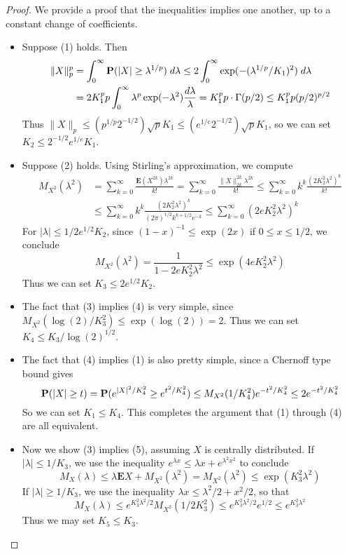 \begin{proof}
    We provide a proof that the inequalities implies one another, up to a constant change of coefficients. 
    \begin{itemize}
        \item Suppose (1) holds. Then
    \begin{align*}
        \| X \|_p^p &= \int_0^\infty \operatorname{\mathbf{P}}(|X| \geq \lambda^{1/p})\; d\lambda \leq 2 \int_0^\infty \exp(-(\lambda^{1/p}/K_1)^2)\; d\lambda\\
        &= 2 K_1^p p \int_0^\infty \lambda^p \exp(-\lambda^2) \frac{d\lambda}{\lambda} = K_1^p p \cdot \Gamma(p/2) \leq K_1^p p (p/2)^{p/2}
    \end{align*}
    Thus $\| X \|_p \leq (p^{1/p} 2^{-1/2}) \sqrt{p} K_1 \leq (e^{1/e} 2^{-1/2}) \sqrt{p} K_1$, so we can set $K_2 \leq 2^{-1/2} e^{1/e} K_1$.

    \item Suppose (2) holds. Using Stirling's approximation, we compute
    \begin{align*}
        M_{X^2}(\lambda^2) &= \sum_{k = 0}^\infty \frac{\mathbf{E}(X^{2k}) \lambda^{2k}}{k!} = \sum_{k = 0}^\infty \frac{\| X \|_{2k}^{2k} \lambda^{2k}}{k!} \leq \sum_{k = 0}^\infty k^k \frac{(2 K_2^2 \lambda^2)^k}{k!}\\
        &\leq \sum_{k = 0}^\infty k^k \frac{(2 K_2^2 \lambda^2)^k}{(2\pi)^{1/2} k^{k + 1/2} e^{-k}} \leq \sum_{k = 0}^\infty (2 e K_2^2 \lambda^2)^k
    \end{align*}
    For $|\lambda| \leq 1/2e^{1/2} K_2$, since $(1-x)^{-1} \leq \exp(2x)$ if $0 \leq x \leq 1/2$, we conclude
    \[ M_{X^2}(\lambda^2) = \frac{1}{1 - 2e K_2^2 \lambda^2} \leq \exp(4e K_2^2 \lambda^2) \]
    Thus we can set $K_3 \leq 2e^{1/2} K_2$.

    \item The fact that (3) implies (4) is very simple, since $M_{X^2}(\log(2)/K_3^2) \leq \exp(\log(2)) = 2$. Thus we can set $K_4 \leq K_3/\log(2)^{1/2}$.

    \item The fact that (4) implies (1) is also pretty simple, since a Chernoff type bound gives
    \[ \operatorname{\mathbf{P}}(|X| \geq t) = \operatorname{\mathbf{P}}(e^{|X|^2/K_4^2} \geq e^{t^2/K_4^2}) \leq M_{X^2}(1/K_4^2) e^{-t^2/K_4^2} \leq 2e^{-t^2/K_4^2} \]
    So we can set $K_1 \leq K_4$. This completes the argument that (1) through (4) are all equivalent.

    \item Now we show (3) implies (5), assuming $X$ is centrally distributed. If $|\lambda| \leq 1/K_3$, we use the inequality $e^{\lambda x} \leq \lambda x + e^{\lambda^2 x^2}$ to conclude
    \[ M_X(\lambda) \leq \lambda \mathbf{E} X + M_{X^2}(\lambda^2) = M_{X^2}(\lambda^2) \leq \exp(K_3^2 \lambda^2) \]
    If $|\lambda| \geq 1/K_3$, we use the inequality $\lambda x \leq \lambda^2/2 + x^2/2$, so that
    \[ M_X(\lambda) \leq e^{K_3^2 \lambda^2/2} M_{X^2}(1/2 K_3^2) \leq e^{K_3^2 \lambda^2/2} e^{1/2} \leq e^{K_3^2 \lambda^2} \]
    Thus we may set $K_5 \leq K_3$.


\end{itemize}
\end{proof}
